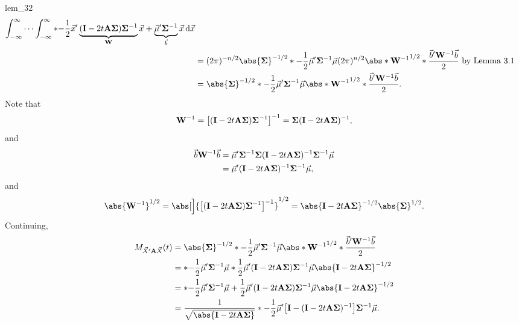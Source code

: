 \begin{Lemma}{}{lem_32}
\begin{align*}
        \int_{-\infty}^{\infty}\cdots \int_{-\infty}^{\infty}
        \exp*{-\frac{1}{2}\Vector{x}'\underbrace{(\Matrix{I}-2t \Matrix{A}\Matrix{\Sigma})\Matrix{\Sigma}^{-1}}_{\Matrix{W}}\Vector{x}+\underbrace{\Vector{\mu}' \Matrix{\Sigma}^{-1}}_{\Vector{b}}\Vector{x}}
        \odif{\Vector{x}}                                                                                                 \\
         & =(2\pi)^{-n/2}\abs{\Matrix{\Sigma}}^{-1/2}\exp*{-\frac{1}{2}\Vector{\mu}'\Matrix{\Sigma}^{-1}\Vector{\mu}}
        (2\pi)^{n/2}\abs*{\Matrix{W}^{-1}}^{1/2}\exp*{\frac{\Vector{b}'\Matrix{W}^{-1}\Vector{b}}{2}}\text{ by Lemma 3.1} \\
         & =\abs{\Matrix{\Sigma}}^{-1/2}\exp*{-\frac{1}{2}\Vector{\mu}'\Matrix{\Sigma}^{-1}\Vector{\mu}}
        \abs*{\Matrix{W}^{-1}}^{1/2}\exp*{\frac{\Vector{b}'\Matrix{W}^{-1}\Vector{b}}{2}}.
    \end{align*}
    Note that
    \[ \mathbf{W}^{-1}=\bigl[(\mathbf{I}-2t \mathbf{A\Sigma})\mathbf{\Sigma}^{-1}\bigr]^{-1}=\mathbf{\Sigma}(\mathbf{I}-2t \mathbf{A\Sigma})^{-1}, \]
    and
    \begin{align*}
        \vec{b}\mathbf{W}^{-1}\vec{b}
         & =\vec{\mu}'\mathbf{\Sigma}^{-1}\mathbf{\Sigma}(\mathbf{I}-2t \mathbf{A\Sigma})^{-1}\mathbf{\Sigma}^{-1}\vec{\mu} \\
         & =\vec{\mu}'(\mathbf{I}-2t \mathbf{A\Sigma})^{-1}\mathbf{\Sigma}^{-1}\vec{\mu},
    \end{align*}
    and
    \[ \abs{\Matrix{W}^{-1}}^{1/2}=\abs[\Big]{\bigl[(\Matrix{I}-2t \Matrix{A\Sigma})\Matrix{\Sigma}^{-1}\bigr]^{-1}}^{1/2}
        =\abs{\Matrix{I}-2t \Matrix{A\Sigma}}^{-1/2}\abs{\Matrix{\Sigma}}^{1/2}. \]
    Continuing,
    \begin{align*}
        M_{\Vector{X}'\Matrix{A}\Vector{X}}(t)
         & =\abs{\Matrix{\Sigma}}^{-1/2}\exp*{-\frac{1}{2}\Vector{\mu}'\Matrix{\Sigma}^{-1}\Vector{\mu}}
        \abs*{\Matrix{W}^{-1}}^{1/2}\exp*{\frac{\Vector{b}'\Matrix{W}^{-1}\Vector{b}}{2}}                \\
         & =\exp*{-\frac{1}{2}\Vector{\mu}'\Matrix{\Sigma}^{-1}\Vector{\mu}}
        \exp*{\frac{1}{2}\Vector{\mu}'(\Matrix{I}-2t \Matrix{A\Sigma})\Matrix{\Sigma}^{-1}\Vector{\mu}}
        \abs{\Matrix{I}-2t \Matrix{A\Sigma}}^{-1/2}                                                      \\
         & =\exp*{-\frac{1}{2}\Vector{\mu}'\Matrix{\Sigma}^{-1}\Vector{\mu}
            +\frac{1}{2}\Vector{\mu}'(\Matrix{I}-2t \Matrix{A\Sigma})\Matrix{\Sigma}^{-1}\Vector{\mu}}
        \abs{\Matrix{I}-2t \Matrix{A\Sigma}}^{-1/2}                                                      \\
         & =\frac{1}{\sqrt{\abs{\Matrix{I}-2t \Matrix{A}\Matrix{\Sigma}}}}
        \exp*{-\frac{1}{2}\Vector{\mu}'\bigl[\Matrix{I}-(\Matrix{I}-2t \Matrix{A}\Matrix{\Sigma})^{-1}\bigr]\Matrix{\Sigma}^{-1}\Vector{\mu}}.
    \end{align*}
\end{Lemma}
